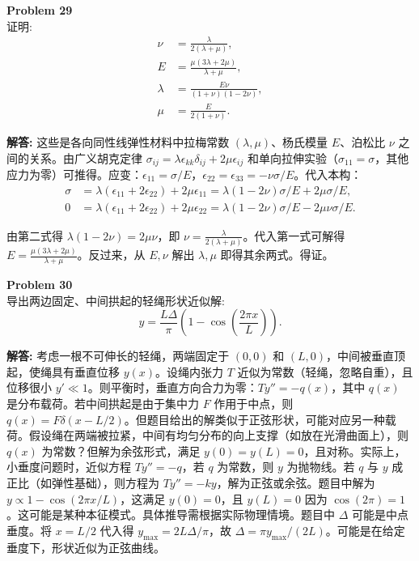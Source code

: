\documentclass[12pt, a4paper, oneside]{ctexart}
\newenvironment{solution}{\par\noindent\textbf{解答:}\quad}{\par}
\begin{document}
\begin{mdframed}[backgroundcolor=gray!10, linewidth=0pt]
    \textbf{Problem 29} \\
    证明:
    \[
    \begin{aligned}
        \nu &= \frac{\lambda}{2(\lambda+\mu)}, \\
        E &= \frac{\mu(3\lambda+2\mu)}{\lambda+\mu}, \\
        \lambda &= \frac{E\nu}{(1+\nu)(1-2\nu)}, \\
        \mu &= \frac{E}{2(1+\nu)}.
    \end{aligned}
    \]
\end{mdframed}
\begin{solution}
    这些是各向同性线弹性材料中拉梅常数 \((\lambda, \mu)\)、杨氏模量 \(E\)、泊松比 \(\nu\) 之间的关系。由广义胡克定律 \(\sigma_{ij} = \lambda \epsilon_{kk} \delta_{ij} + 2\mu \epsilon_{ij}\) 和单向拉伸实验（\(\sigma_{11} = \sigma\)，其他应力为零）可推得。应变：\(\epsilon_{11} = \sigma/E\)，\(\epsilon_{22}=\epsilon_{33} = -\nu \sigma/E\)。代入本构：
    \begin{align*}
        \sigma &= \lambda (\epsilon_{11}+2\epsilon_{22}) + 2\mu \epsilon_{11} = \lambda (1-2\nu)\sigma/E + 2\mu \sigma/E, \\
        0 &= \lambda (\epsilon_{11}+2\epsilon_{22}) + 2\mu \epsilon_{22} = \lambda (1-2\nu)\sigma/E - 2\mu \nu \sigma/E.
    \end{align*}
    
    由第二式得 \(\lambda (1-2\nu) = 2\mu \nu\)，即 \(\nu = \frac{\lambda}{2(\lambda+\mu)}\)。代入第一式可解得 \(E = \frac{\mu(3\lambda+2\mu)}{\lambda+\mu}\)。反过来，从 \(E, \nu\) 解出 \(\lambda, \mu\) 即得其余两式。得证。
\end{solution}

\begin{mdframed}[backgroundcolor=gray!10, linewidth=0pt]
    \textbf{Problem 30} \\
    导出两边固定、中间拱起的轻绳形状近似解:
    \[
    y = \frac{L\Delta}{\pi} \left(1 - \cos\left(\frac{2\pi x}{L}\right)\right).
    \]
\end{mdframed}
\begin{solution}
    考虑一根不可伸长的轻绳，两端固定于 \((0,0)\) 和 \((L,0)\)，中间被垂直顶起，使绳具有垂直位移 \(y(x)\)。设绳内张力 \(T\) 近似为常数（轻绳，忽略自重），且位移很小 \(y' \ll 1\)。则平衡时，垂直方向合力为零：\(T y'' = -q(x)\)，其中 \(q(x)\) 是分布载荷。若中间拱起是由于集中力 \(F\) 作用于中点，则 \(q(x) = F \delta(x-L/2)\)。但题目给出的解类似于正弦形状，可能对应另一种载荷。假设绳在两端被拉紧，中间有均匀分布的向上支撑（如放在光滑曲面上），则 \(q(x)\) 为常数？但解为余弦形式，满足 \(y(0)=y(L)=0\)，且对称。实际上，小垂度问题时，近似方程 \(T y'' = -q\)，若 \(q\) 为常数，则 \(y\) 为抛物线。若 \(q\) 与 \(y\) 成正比（如弹性基础），则方程为 \(T y'' = -k y\)，解为正弦或余弦。题目中解为 \(y \propto 1-\cos(2\pi x/L)\)，这满足 \(y(0)=0\)，且 \(y(L)=0\) 因为 \(\cos(2\pi)=1\)。这可能是某种本征模式。具体推导需根据实际物理情境。题目中 \(\Delta\) 可能是中点垂度。将 \(x=L/2\) 代入得 \(y_{\text{max}} = 2L\Delta/\pi\)，故 \(\Delta = \pi y_{\text{max}}/(2L)\)。可能是在给定垂度下，形状近似为正弦曲线。
\end{solution}
\end{document}
